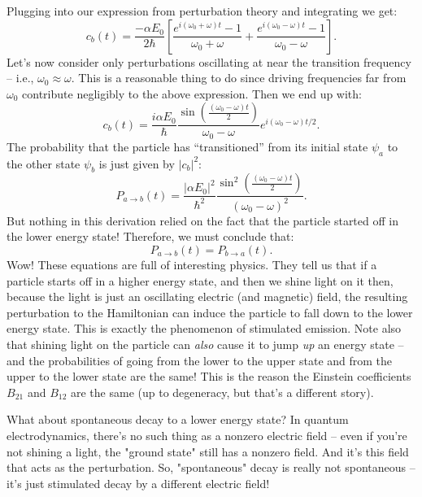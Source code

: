 \documentclass{article}
\begin{document}
Plugging into our expression from perturbation theory and integrating we get:
\begin{equation}
c_b(t) = \frac{-\alpha E_0}{2\hbar}\left[\frac{e^{i(\omega_0 + \omega)t} -1}{\omega_0 + \omega}  + \frac{e^{i(\omega_0 - \omega)t} -1}{\omega_0 - \omega}\right].
\end{equation}
Let's now consider only perturbations oscillating at near the transition frequency -- i.e., $\omega_0 \approx \omega$. This is a reasonable thing to do since driving frequencies far from $\omega_0$ contribute negligibly to the above expression. Then we end up with:
\begin{equation}
c_b(t) = \frac{i\alpha E_0}{\hbar}\frac{\sin\left(\frac{(\omega_0 - \omega)t}{2}\right)}{\omega_0 - \omega}e^{i(\omega_0-\omega)t/2}.
\end{equation}
The probability that the particle has ``transitioned'' from its initial state $\psi_a$ to the other state $\psi_b$ is just given by $|c_b|^2$:
\begin{equation}
P_{a \rightarrow b}(t) = \frac{|\alpha E_0|^2}{\hbar^2}\frac{\sin^2\left(\frac{(\omega_0 - \omega)t}{2}\right)}{(\omega_0 - \omega)^2}.
\end{equation}
But nothing in this derivation relied on the fact that the particle started off in the lower energy state! Therefore, we must conclude that:
\begin{equation}
P_{a \rightarrow b}(t)  = P_{b \rightarrow a}(t). 
\end{equation}
Wow! These equations are full of interesting physics. They tell us that if a particle starts off in a higher energy state, and then we shine light on it then, because the light is just an oscillating electric (and magnetic) field, the resulting perturbation to the Hamiltonian can induce the particle to fall down to the lower energy state. This is exactly the phenomenon of stimulated emission. Note also that shining light on the particle can \textit{also} cause it to jump \textit{up} an energy state -- and the probabilities of going from the lower to the upper state and from the upper to the lower state are the same! This is the reason the Einstein coefficients $B_{21}$ and $B_{12}$ are the same (up to degeneracy, but that's a different story).

What about spontaneous decay to a lower energy state? In quantum electrodynamics, there's no such thing as a nonzero electric field -- even if you're not shining a light, the "ground state" still has a nonzero field. And it's this field that acts as the perturbation. So, "spontaneous" decay is really not spontaneous -- it's just stimulated decay by a different electric field!
\end{document}
